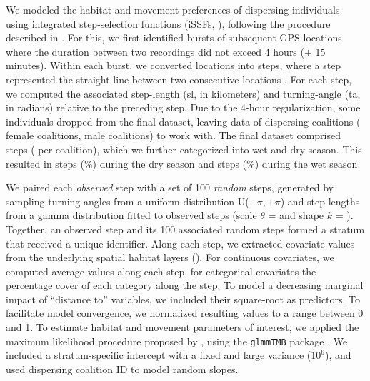 \documentclass[abstract=on,10pt,a4paper,bibliography=totocnumbered]{article}
\newcommand{\inputy}[1]{\unskip}
\begin{document}
We modeled the habitat and movement preferences of dispersing individuals using
integrated step-selection functions (iSSFs, \citealp{Fortin.2005, Avgar.2016}),
following the procedure described in \citet{Muff.2020}. For this, we first
identified bursts of subsequent GPS locations where the duration between two
recordings did not exceed 4 hours (\(\pm\) 15 minutes). Within each burst, we
converted locations into steps, where a step represented the straight line
between two consecutive locations \citep{Turchin.1998}. For each step, we
computed the associated step-length (sl, in kilometers) and turning-angle (ta,
in radians) relative to the preceding step. Due to the 4-hour regularization,
some individuals dropped from the final dataset, leaving data of
\inputy{GeneralMetrics/SSFTotal} dispersing coalitions
(\inputy{GeneralMetrics/SSFFemales} female coalitions,
\inputy{GeneralMetrics/SSFMales} male coalitions) to work with. The final
dataset comprised \inputy{GeneralMetrics/StepsTotal} steps
(\inputy{GeneralMetrics/StepsMeanSD} per coalition), which we further
categorized into wet and dry season. This resulted in
\inputy{GeneralMetrics/NumberStepsDry} steps
(\inputy{GeneralMetrics/PercentageStepsDry}\%) during the dry season and
\inputy{GeneralMetrics/NumberStepsWet} steps
(\inputy{GeneralMetrics/PercentageStepsWet}\%) during the wet season.

We paired each \textit{observed} step with a set of 100 \textit{random} steps,
generated by sampling turning angles from  a uniform distribution U(\(-\pi,
+\pi\)) and step lengths from a gamma distribution fitted to observed steps
(scale \(\theta\) = \inputy{GeneralMetrics/GammaScale} and shape \(k\) =
\inputy{GeneralMetrics/GammaShape}). Together, an observed step and its 100
associated random steps formed a stratum that received a unique identifier.
Along each step, we extracted covariate values from the underlying spatial
habitat layers (). For continuous covariates, we computed
average values along each step, for categorical covariates the percentage cover
of each category along the step. To model a decreasing marginal impact of
``distance to'' variables, we included their square-root as predictors. To
facilitate model convergence, we normalized resulting values to a range between
0 and 1. To estimate habitat and movement parameters of interest, we applied the
maximum likelihood procedure proposed by \citet{Muff.2020}, using the
\texttt{glmmTMB} package \citep{Brooks.2017}. We included a stratum-specific
intercept with a fixed and large variance ($10^6$), and used dispersing
coalition ID to model random slopes.
\end{document}
